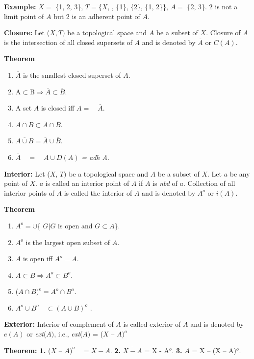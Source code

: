 \documentclass[12pt]{amsart}
\begin{document}
\textbf{Example:} $X =$ {\{}1, 2, 3{\}}, $T = ${\{}$X$, , {\{}1{\}}, {\{}2{\}}, {\{}1, 
2{\}}{\}}, $A =$ {\{}2, 3{\}}. 2 is not a limit point of $A$ but 2 is an adherent 
point of $A$.

\textbf{Closure:} Let ($X, T)$ be a topological space and $A$ be a subset of $X$. 
Closure of $A$ is the intersection of all closed supersets of $A$ and is denoted 
by $\overline A $ or $C (A)$.

\textbf{Theorem}

\begin{enumerate}
\item $\overline A $ is the smallest closed superset of $A$.
\item A$\subset $B$\Rightarrow \overline A \subset \overline B $.
\item A set $A$ is closed iff $A = \quad \overline A $.
\item $\overline {A\cap B} \subset \overline A \cap \overline B .$
\item $\overline {A\cup B} =\overline A \cup \overline B .$
\item $\overline A \quad = \quad A\cup D(A)$ \textit{= adh A}.
\end{enumerate}

\textbf{Interior:} Let ($X$, $T)$ be a topological space and $A$ be a subset of $X$. Let 
$a$ be any point of $X$. $a$ is called an interior point of $A$ if $A$ is \textit{nbd} of $a$. Collection 
of all interior points of $A$ is called the interior of $A$ and is denoted by 
$A^{o}$ or $i (A)$.

\textbf{Theorem}

\begin{enumerate}
\item $A^{o}=\cup ${\{} $G\vert G$ is open and $G\subset A${\}}.
\item $A^{o}$ is the largest open subset of $A$.
\item $A$ is open iff $A^{o}=A$.
\item $A\subset B\Rightarrow  A^{o}\subset  B^{o}$.
\item ($A\cap B)^{o}=A^{o}\cap  B ^{o}$.
\item $A^{o}\cup  B^{o} \quad \subset (A\cup B)^{o}$ .
\end{enumerate}

\textbf{Exterior:} Interior of complement of $A$ is called exterior of $A$ and is 
denoted by $e(A)$ or \textit{ext}($A)$, i.e., \textit{ext}($A)$ = ($X$ -- $A)^{o}$

\textbf{Theorem: 1. }($X$ -- $A)^{o} \quad = X-\overline A $. \textbf{2.} $\overline 
{X-A} $ = X - A$^{o}$. \textbf{3.} $\overline A $ = X -- (X -- A)$^{o}$.
\end{document}
